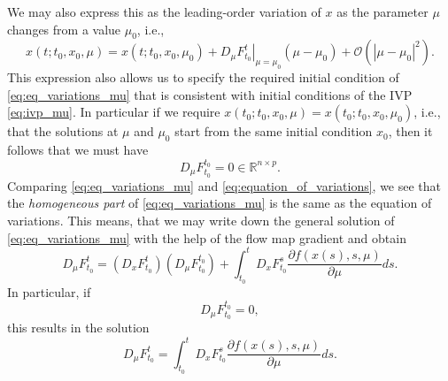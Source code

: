 We may also express this as the leading-order variation of $x$ as the parameter $\mu$ changes from a value $\mu_0$, i.e., 
\begin{equation}
x(t;t_0, x_0, \mu) = x(t;t_0, x_0, \mu_0) +  \left. D_\mu  F_{t_0}^t\right\vert_{\mu=\mu_0}(\mu - \mu_0) + \mathcal{O}(|\mu-\mu_0|^2).
\end{equation}
This expression also allows us to specify the required initial condition of \eqref{eq:eq_variations_mu} that is consistent with initial conditions of the IVP \eqref{eq:ivp_mu}. In particular if we require $x(t_0;t_0, x_0, \mu) = x(t_0;t_0, x_0, \mu_0)$, i.e., that the solutions at $\mu$ and $\mu_0$ start from the same initial condition $x_0$, then it follows that we must have 
\begin{equation}
D_\mu  F_{t_0}^{t_0} = 0 \in \mathbb{R}^{n\times p}. 
\end{equation}
Comparing \eqref{eq:eq_variations_mu} and \eqref{eq:equation_of_variations}, we see that the {\em homogeneous part} of \eqref{eq:eq_variations_mu} is the same as the equation of variations. This means, that we may write down the general solution of  \eqref{eq:eq_variations_mu} with the help of the flow map gradient and obtain
\begin{equation}
\label{eq:general_solution_eqref_mu}
 D_\mu F_{t_0}^t = \left(D_x F_{t_0}^{t}\right) \left(D_\mu F_{t_0}^{t_0}\right) + \int_{t_0}^t D_x F_{t_0}^{s}   \frac{\partial f(x(s), s, \mu )}{\partial \mu} ds.
\end{equation}
In particular, if
\begin{equation}
D_\mu F_{t_0}^{t_0} = 0,
\end{equation}
this results in the solution 
\begin{equation}
 D_\mu F_{t_0}^t =\int_{t_0}^t D_x F_{t_0}^{s}   \frac{\partial f(x(s), s, \mu )}{\partial \mu} ds.
\end{equation}
